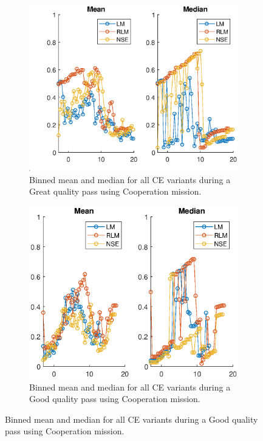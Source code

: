 \begin{figure}[ht]
\begin{subfigure}{0.50\linewidth}
\includegraphics[scale=0.6]{figures/flight_results/coop_great_mean_median.eps}
\caption{Binned mean and median for all CE variants during a Great quality pass using Cooperation mission.}
\label{fig:flightCoopGreatMeanMed}
\end{subfigure}%
\begin{subfigure}{0.50\linewidth}
\includegraphics[scale=0.6]{figures/flight_results/Coop_good_mean_median.eps}
\caption{Binned mean and median for all CE variants during a Good quality pass using Cooperation mission.}

\end{subfigure}
\end{figure}

